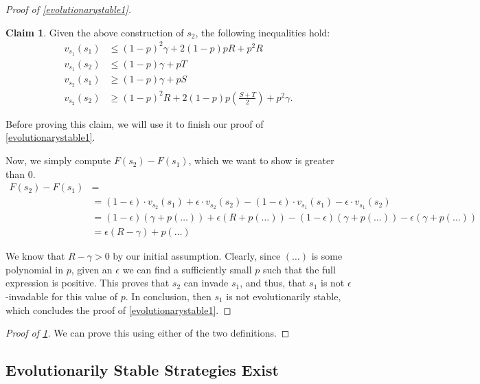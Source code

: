 \documentclass[11pt]{amsart}
\theoremstyle{definition}
\newtheorem{claim}{Claim}
\theoremstyle{remark}
\begin{document}
\begin{proof}[Proof of \cref{evolutionarystable1}]
      \begin{claim}
        \label{claimpayoffs}
        Given the above construction of $s_2$, the following inequalities hold:
      \begin{align*}
        v_{s_1}(s_1) &\leq (1-p)^2 \gamma + 2(1-p)p R + p^2  R \\ 
        v_{s_1}(s_2) &\leq (1-p) \gamma + p T \\
        v_{s_2}(s_1) &\geq (1 - p) \gamma  + p S \\
        v_{s_2}(s_2) &\geq (1-p)^{2} R + 2 (1-p) p (\tfrac{S + T}{2}) + p^2 \gamma .
      \end{align*}
      \end{claim}

      Before proving this claim, we will use it to finish our proof of \cref{evolutionarystable1}.

      Now, we simply compute $F(s_2) - F(s_1)$, which we want to show is greater than 0.
      \begin{align*}
        F(s_2) - F(s_1) &= \\
        &= (1 - \epsilon) \cdot v_{s_2}(s_1) + \epsilon \cdot v_{s_2}(s_2) - (1 - \epsilon) \cdot v_{s_1}(s_1) - \epsilon \cdot v_{s_1}(s_2) \\
        &= (1 - \epsilon) (\gamma + p(\ldots)) + \epsilon (R + p(\ldots)) - (1-\epsilon) (\gamma + p(\ldots)) - \epsilon (\gamma + p(\ldots)) \\
        &= \epsilon (R - \gamma) + p(\ldots)
      \end{align*}

      We know that $R - \gamma > 0$ by our initial assumption. Clearly, since $(\ldots)$ is some polynomial in $p$, given an $\epsilon$ we can find a sufficiently small $p$ such that the full expression is positive. This proves that $s_2$ can invade $s_1$, and thus, that $s_1$ is not $\epsilon$-invadable for this value of $p$. In conclusion, then $s_1$ is not evolutionarily stable, which concludes the proof of \cref{evolutionarystable1}.

    \end{proof}

    \begin{proof}[Proof of \cref{claimpayoffs}]
      We can prove this using either of the two definitions.
    \end{proof}

    \subsection{Evolutionarily Stable Strategies Exist}
\end{document}
